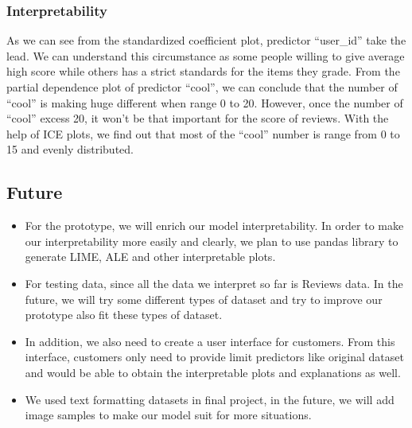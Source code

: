 \documentclass{article}
\begin{document}
\subsubsection{Interpretability}
As we can see from the standardized coefficient plot, predictor “user\_id” take the lead. We can understand this circumstance as some people willing to give average high score while others has a strict standards for the items they grade.
From the partial dependence plot of predictor “cool”, we can conclude that the number of “cool” is making huge different when range 0 to 20. However, once the number of “cool” excess 20, it won’t be that important for the score of reviews.
With the help of ICE plots, we find out that most of the “cool” number is range from 0 to 15 and evenly distributed.


\subsection{Future}
\begin{itemize}
\item For the prototype, we will enrich our model interpretability. In order to make our interpretability more easily and clearly, we plan to use pandas library to generate LIME, ALE and other interpretable plots. 

\item For testing data, since all the data we interpret so far is Reviews data. In the future, we will try some different types of dataset and try to improve our prototype also fit these types of dataset.

\item In addition, we also need to create a user interface for customers. From this interface, customers only need to provide limit predictors like original dataset and would be able to obtain the interpretable plots and explanations as well.

\item We used text formatting datasets in final project, in the future, we will add image samples to make our model suit for more situations.

\end{itemize}

  
\end{document}
